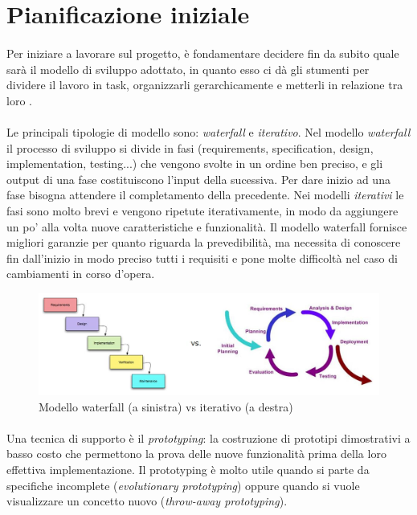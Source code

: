 \documentclass[11pt,a4paper,english]{article}
\begin{document}
\newpage
\section{Pianificazione iniziale}

\paragraph{} Per iniziare a lavorare sul progetto, è fondamentare decidere fin da subito quale sarà il modello di sviluppo adottato, in quanto esso ci dà gli stumenti per dividere il lavoro in task, organizzarli gerarchicamente e metterli in relazione tra loro  \cite{modelli_sviluppo, agile_manifesto}. 

\paragraph{} Le principali tipologie di modello sono: \emph{waterfall} e \emph{iterativo}. Nel modello \emph{waterfall} il processo di sviluppo si divide in fasi (requirements, specification, design, implementation, testing...) che vengono svolte in un ordine ben preciso, e gli output di una fase costituiscono l'input della sucessiva. Per dare inizio ad una fase bisogna attendere il completamento della precedente. Nei modelli \emph{iterativi} le fasi sono molto brevi e vengono ripetute iterativamente, in modo da aggiungere un po' alla volta nuove caratteristiche e funzionalità. Il modello waterfall fornisce migliori garanzie per quanto riguarda la prevedibilità, ma necessita di conoscere fin dall'inizio in modo preciso tutti i requisiti e pone molte difficoltà nel caso di cambiamenti in corso d'opera.

\begin{figure}[H]
    \centering
    \includegraphics[width=1.0\textwidth]{img/waterfall_vs_iterativo.jpeg}
    \caption{Modello waterfall (a sinistra) vs iterativo (a destra)}
\end{figure}

\paragraph{} Una tecnica di supporto è il \emph{prototyping}: la costruzione di prototipi dimostrativi a basso costo che permettono la prova delle nuove funzionalità prima della loro effettiva implementazione. Il prototyping è molto utile quando si parte da specifiche incomplete (\emph{evolutionary prototyping}) oppure quando si vuole visualizzare un concetto nuovo (\emph{throw-away prototyping}). 
\end{document}
